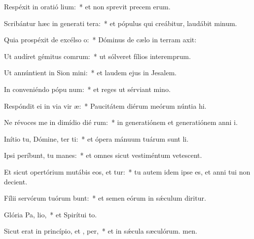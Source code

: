 \item Respéxit in oratió lium:~* et non sprevit precem erum.
\item Scribántur hæc in generati tera:~* et pópulus qui creábitur, laudábit minum.
\item Quia prospéxit de excélso  o:~* Dóminus de cælo in terram axit:
\item Ut audíret gémitus comrum:~* ut sólveret fílios interemprum.
\item Ut annúntient in Sion  mini:~* et laudem ejus in Jesalem.
\item In conveniéndo pópu  num:~* et reges ut sérviant mino.
\item Respóndit ei in via vir æ:~* Paucitátem diérum meórum núntia hi.
\item Ne révoces me in dimídio dié rum:~* in generatiónem et generatiónem anni i.
\item Inítio tu, Dómine, ter ti:~* et ópera mánuum tuárum sunt li.
\item Ipsi períbunt, tu  manes:~* et omnes sicut vestiméntum vetescent.
\item Et sicut opertórium mutábis eos, et tur:~* tu autem idem ipse es, et anni tui non decient.
\item Fílii servórum tuórum bunt:~* et semen eórum in sǽculum diritur.
\item Glória Pa,  lio,~* et Spirítui to.
\item Sicut erat in princípio, et ,  per,~* et in sǽcula sæculórum. men.
